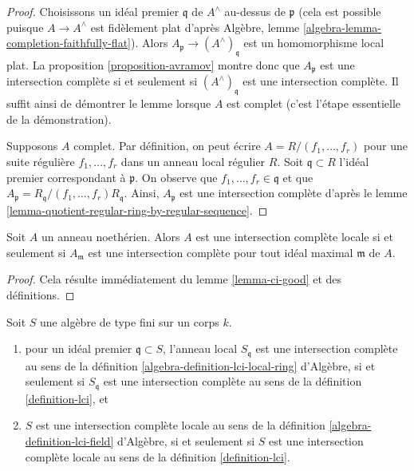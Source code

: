 \begin{proof}
Choisissons un idéal premier $\mathfrak q$ de $A^\wedge$ au-dessus de $\mathfrak p$
(cela est possible puisque $A \to A^\wedge$ est fidèlement plat
d'après Algèbre, lemme \ref{algebra-lemma-completion-faithfully-flat}).
Alors $A_\mathfrak p \to (A^\wedge)_\mathfrak q$ est un
homomorphisme local plat. La proposition \ref{proposition-avramov}
montre donc que $A_\mathfrak p$ est une intersection complète si et seulement si
$(A^\wedge)_\mathfrak q$ est une intersection complète. Il suffit ainsi
de démontrer le lemme lorsque $A$ est complet (c'est l'étape essentielle de
la démonstration).

\medskip\noindent
Supposons $A$ complet. Par définition, on peut écrire
$A = R/(f_1, \ldots, f_r)$ pour une suite régulière
$f_1, \ldots, f_r$ dans un anneau local régulier $R$.
Soit $\mathfrak q \subset R$ l'idéal premier correspondant à $\mathfrak p$.
On observe que $f_1, \ldots, f_r \in\mathfrak q$ et que
$A_\mathfrak p = R_\mathfrak q/(f_1, \ldots, f_r)R_\mathfrak q$.
Ainsi, $A_\mathfrak p$ est une intersection complète d'après
le lemme \ref{lemma-quotient-regular-ring-by-regular-sequence}.
\end{proof}

\begin{lemma}
\label{lemma-check-lci-at-maximal-ideals}
Soit $A$ un anneau noethérien. Alors $A$ est une intersection complète locale
si et seulement si $A_\mathfrak m$ est une intersection complète pour
tout idéal maximal $\mathfrak m$ de $A$.
\end{lemma}

\begin{proof}
Cela résulte immédiatement du lemme \ref{lemma-ci-good} et des définitions.
\end{proof}

\begin{lemma}
\label{lemma-check-lci-agrees}
Soit $S$ une algèbre de type fini sur un corps $k$.
\begin{enumerate}
\item pour un idéal premier $\mathfrak q \subset S$, l'anneau local $S_\mathfrak q$
est une intersection complète au sens
de la définition \ref{algebra-definition-lci-local-ring} d'Algèbre,
si et seulement si $S_\mathfrak q$ est une
intersection complète au sens de la définition \ref{definition-lci}, et
\item $S$ est une intersection complète locale au
sens de la définition \ref{algebra-definition-lci-field}
d'Algèbre, si et seulement si $S$ est une
intersection complète locale au sens de la définition \ref{definition-lci}.
\end{enumerate}
\end{lemma}

